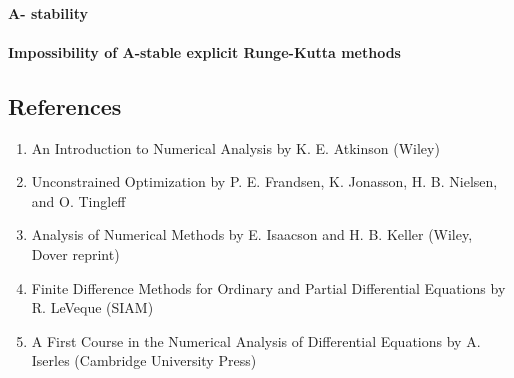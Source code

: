 \documentclass[a4paper,12pt]{article} %
\begin{document}
\paragraph{A- stability}
\paragraph{Impossibility of A-stable explicit Runge-Kutta methods}

\subsection{References}
\begin{enumerate}
	\item An Introduction to Numerical Analysis by K. E. Atkinson (Wiley)
	\item Unconstrained Optimization by P. E. Frandsen, K. Jonasson, H. B. Nielsen, and O. Tingleff
	\item Analysis of Numerical Methods by E. Isaacson and H. B. Keller (Wiley, Dover reprint)
	\item Finite Difference Methods for Ordinary and Partial Differential Equations by R. LeVeque (SIAM)
	\item A First Course in the Numerical Analysis of Differential Equations by A. Iserles (Cambridge University Press)
\end{enumerate}





\end{document}

